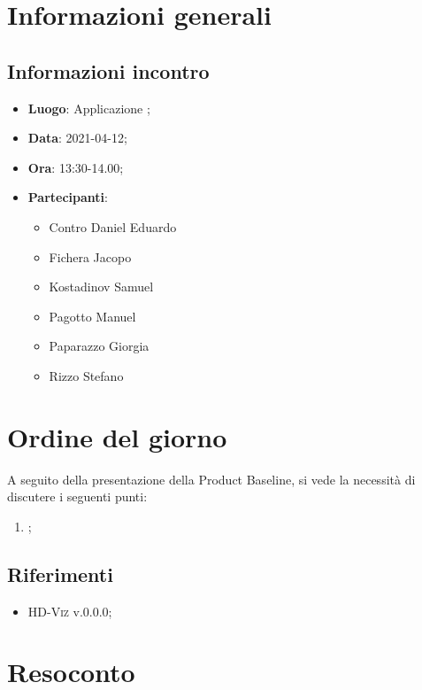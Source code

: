 \documentclass{article}
\begin{document}


\section{Informazioni generali}
\label{sec:info_generali}

\subsection{Informazioni incontro}
\label{sub:info_incontro}

\begin{itemize}
	\item \textbf{Luogo}: Applicazione ;
	\item \textbf{Data}: 2021-04-12;
	\item \textbf{Ora}: 13:30-14.00;
	\item \textbf{Partecipanti}:
	\begin{itemize}
		\item Contro Daniel Eduardo
		\item Fichera Jacopo
		\item Kostadinov Samuel
        \item Pagotto Manuel
		\item Paparazzo Giorgia
		\item Rizzo Stefano
	\end{itemize}
\end{itemize}

\section{Ordine del giorno}%
\label{sec:ordine_del_giorno}
A seguito della presentazione della Product Baseline, si vede la necessità di discutere i seguenti punti:
\begin{enumerate}
	\item {};
\end{enumerate}


\subsection{Riferimenti}%
\label{sub:riferimenti}
\begin{itemize}
    \item \textsc{HD-Viz} v.0.0.0;
    \end{itemize}

\newpage
\section{Resoconto}
\label{sec:resoconto}
\end{document}
